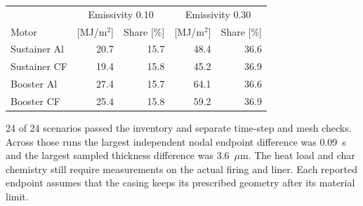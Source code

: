\begin{center}\small\begin{tabular}{lrrrr}\toprule
&\multicolumn{2}{c}{Emissivity 0.10}&\multicolumn{2}{c}{Emissivity 0.30}\\
Motor & [MJ/m$^2$] & Share [\%]& [MJ/m$^2$] & Share [\%]\\\midrule
Sustainer Al & 20.7 & 15.7 & 48.4 & 36.6 \\
Sustainer CF & 19.4 & 15.8 & 45.2 & 36.9 \\
Booster Al & 27.4 & 15.7 & 64.1 & 36.6 \\
Booster CF & 25.4 & 15.8 & 59.2 & 36.9 \\
\bottomrule\end{tabular}\end{center}
24 of 24 scenarios passed the inventory and separate time-step and mesh checks. Across those runs the largest independent nodal endpoint difference was 0.09~s and the largest sampled thickness difference was 3.6~$\mu$m. The heat load and char chemistry still require measurements on the
actual firing and liner. Each reported endpoint assumes that the casing
keeps its prescribed geometry after its material limit.
\clearpage
